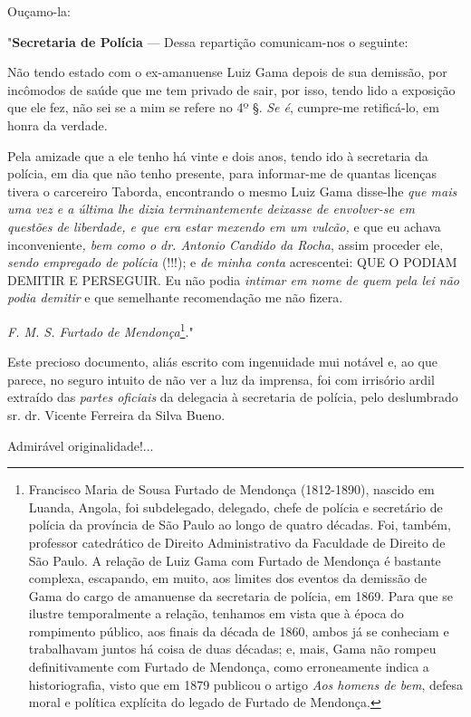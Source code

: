 Ouçamo-la:

"\textbf{Secretaria de Polícia} --- Dessa repartição comunicam-nos o
seguinte:

Não tendo estado com o ex-amanuense Luiz Gama depois de sua demissão,
por incômodos de saúde que me tem privado de sair, por isso, tendo lido
a exposição que ele fez, não sei se a mim se refere no 4º §. \emph{Se
é}, cumpre-me retificá-lo, em honra da verdade.

Pela amizade que a ele tenho há vinte e dois anos, tendo ido à
secretaria da polícia, em dia que não tenho presente, para informar-me
de quantas licenças tivera o carcereiro Taborda, encontrando o mesmo
Luiz Gama disse-lhe \emph{que mais uma vez e a última lhe dizia
terminantemente deixasse de envolver-se em questões de liberdade, e que
era estar mexendo em um vulcão,} e que eu achava inconveniente\emph{,
bem como o dr. Antonio Candido da Rocha}, assim proceder ele,
\emph{sendo empregado de polícia} (!!!); e \emph{de minha conta}
acrescentei: QUE O PODIAM DEMITIR E PERSEGUIR. Eu não podia
\emph{intimar em nome de quem pela lei não podia demitir} e que
semelhante recomendação me não fizera.

\emph{F. M. S. Furtado de Mendonça}\footnote{Francisco Maria de Sousa
  Furtado de Mendonça (1812-1890), nascido em Luanda, Angola, foi
  subdelegado, delegado, chefe de polícia e secretário de polícia da
  província de São Paulo ao longo de quatro décadas. Foi, também,
  professor catedrático de Direito Administrativo da Faculdade de
  Direito de São Paulo. A relação de Luiz Gama com Furtado de Mendonça é
  bastante complexa, escapando, em muito, aos limites dos eventos da
  demissão de Gama do cargo de amanuense da secretaria de polícia, em
  1869. Para que se ilustre temporalmente a relação, tenhamos em vista
  que à época do rompimento público, aos finais da década de 1860, ambos
  já se conheciam e trabalhavam juntos há coisa de duas décadas; e,
  mais, Gama não rompeu definitivamente com Furtado de Mendonça, como
  erroneamente indica a historiografia, visto que em 1879 publicou o
  artigo \emph{Aos homens de bem}, defesa moral e política explícita do
  legado de Furtado de Mendonça.}."

Este precioso documento, aliás escrito com ingenuidade mui notável e, ao
que parece, no seguro intuito de não ver a luz da imprensa, foi com
irrisório ardil extraído das \emph{partes oficiais} da delegacia à
secretaria de polícia, pelo deslumbrado sr. dr. Vicente Ferreira da
Silva Bueno.

Admirável originalidade!...

